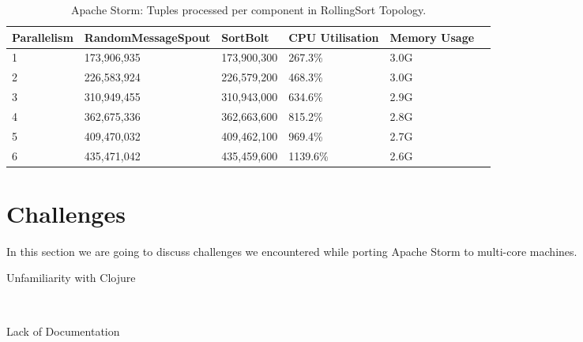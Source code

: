 \medskip
\begin{table}[!htb]
\begin{adjustwidth}{-0.5in}{-0.5in}
\centering
\small
\begin{tabular}{@{}llllll@{}}
    {Parallelism} & {RandomMessageSpout} & {SortBolt} & {CPU Utilisation} & {Memory Usage} \\ \toprule
    1 & {173,906,935} & {173,900,300} & {267.3\%} & {3.0G} \\
    2 & {226,583,924} & {226,579,200} & {468.3\%} & {3.0G} \\
    3 & {310,949,455} & {310,943,000} & {634.6\%} & {2.9G} \\
    4 & {362,675,336} & {362,663,600} & {815.2\%} & {2.8G} \\
    5 & {409,470,032} & {409,462,100} & {969.4\%} & {2.7G} \\
    6 & {435,471,042} & {435,459,600} & {1139.6\%} & {2.6G} \\
\end{tabular}
\caption{Apache Storm: Tuples processed per component in RollingSort Topology.}
\end{adjustwidth}
\label{table:storm_rolling}
\end{table}
\medskip


\section{Challenges}
\label{sec:challenges}

In this section we are going to discuss challenges we encountered while porting Apache Storm to multi-core machines.

\begin{description}
	\item[Unfamiliarity with Clojure] \hfill \\
	
	\item[Lack of Documentation] \hfill \\
	
\end{description}


